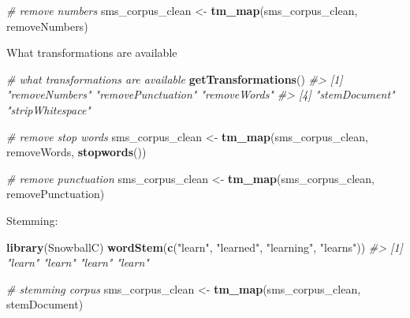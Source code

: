 \documentclass[]{book}
\newenvironment{Shaded}{\begin{snugshade}}{\end{snugshade}}
\newcommand{\CommentTok}[1]{\textcolor[rgb]{0.56,0.35,0.01}{\textit{#1}}}
\newcommand{\KeywordTok}[1]{\textcolor[rgb]{0.13,0.29,0.53}{\textbf{#1}}}
\newcommand{\NormalTok}[1]{#1}
\newcommand{\StringTok}[1]{\textcolor[rgb]{0.31,0.60,0.02}{#1}}
\begin{document}
\begin{Shaded}
\begin{Highlighting}[]
\CommentTok{# remove numbers}
\NormalTok{sms_corpus_clean <-}\StringTok{ }\KeywordTok{tm_map}\NormalTok{(sms_corpus_clean, removeNumbers)}
\end{Highlighting}
\end{Shaded}

What transformations are available

\begin{Shaded}
\begin{Highlighting}[]
\CommentTok{# what transformations are available}
\KeywordTok{getTransformations}\NormalTok{()}
\CommentTok{#> [1] "removeNumbers"     "removePunctuation" "removeWords"      }
\CommentTok{#> [4] "stemDocument"      "stripWhitespace"}
\end{Highlighting}
\end{Shaded}

\begin{Shaded}
\begin{Highlighting}[]
\CommentTok{# remove stop words}
\NormalTok{sms_corpus_clean <-}\StringTok{ }\KeywordTok{tm_map}\NormalTok{(sms_corpus_clean, removeWords, }\KeywordTok{stopwords}\NormalTok{())}
\end{Highlighting}
\end{Shaded}

\begin{Shaded}
\begin{Highlighting}[]
\CommentTok{# remove punctuation}
\NormalTok{sms_corpus_clean <-}\StringTok{ }\KeywordTok{tm_map}\NormalTok{(sms_corpus_clean, removePunctuation)}
\end{Highlighting}
\end{Shaded}

Stemming:

\begin{Shaded}
\begin{Highlighting}[]
\KeywordTok{library}\NormalTok{(SnowballC)}
\KeywordTok{wordStem}\NormalTok{(}\KeywordTok{c}\NormalTok{(}\StringTok{"learn"}\NormalTok{, }\StringTok{"learned"}\NormalTok{, }\StringTok{"learning"}\NormalTok{, }\StringTok{"learns"}\NormalTok{))}
\CommentTok{#> [1] "learn" "learn" "learn" "learn"}
\end{Highlighting}
\end{Shaded}

\begin{Shaded}
\begin{Highlighting}[]
\CommentTok{# stemming corpus}
\NormalTok{sms_corpus_clean <-}\StringTok{ }\KeywordTok{tm_map}\NormalTok{(sms_corpus_clean, stemDocument)}
\end{Highlighting}
\end{Shaded}
\end{document}
